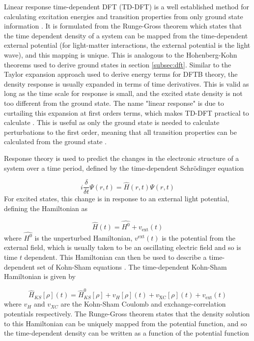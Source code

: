 Linear response time-dependent DFT (TD-DFT) is a well established method for calculating
excitation energies and transition properties from only ground state information \cite{Laurent2013}. 
It is formulated from the Runge-Gross theorem \cite{Runge1984} which states that the
time dependent density of a system can be mapped from the time-dependent external 
potential (for light-matter interactions, the external potential is the light wave), 
and this mapping is unique. This is analogous to the Hohenberg-Kohn theorems used
to derive ground states in section \ref{subsec:dft}. Similar to the Taylor expansion
approach used to derive energy terms for DFTB theory, the density response is usually
expanded in terms of time derivatives. This is valid as long as the time scale for 
response is small, and the excited state density is not too different from the ground
state. The name "linear response" is due to curtailing this expansion at first orders 
terms, which makes TD-DFT practical to calculate \cite{Marques2004}. This is useful
as only the ground state is needed to calculate perturbations to the first order, 
meaning that all transition properties can be calculated from the ground state \cite{Marques2004}.

Response theory is used to predict the changes in the electronic structure of a 
system over a time period, defined by the time-dependent Schr\"{o}dinger equation

\begin{equation}
    i \frac{\delta}{\delta t} \Psi\left(r, t\right) = \hat{H}\left(r, t\right) \Psi\left(r, t\right)
\end{equation}
%
For excited states, this change is in response to an external light potential, defining
the Hamiltonian as

\begin{equation}
\hat{H}\left(t\right) = \hat{H^0} + v_{\text{ext}}\left(t\right)
\end{equation}
%
where $\hat{H^0}$ is the unperturbed Hamiltonian, $v^{\text{ext}}\left(t\right)$ 
is the potential from the external field, which is usually taken to be an oscillating 
electric field and so is time $t$ dependent. This Hamiltonian can then be used to 
describe a time-dependent set of Kohn-Sham equations \cite{Kohn1964}. The time-dependent
Kohn-Sham Hamiltonian is given by

\begin{equation}
\hat{H}_{KS}\left[\rho\right]\left(t\right) = \hat{H}^0_{KS}\left[\rho\right] + v_H\left[\rho\right]\left(t\right) + v_{\text{XC}}\left[\rho\right]\left(t\right) + v_{\text{ext}}\left(t\right)
\end{equation} 
%
where $v_H$ and $v_{XC}$ are the Kohn-Sham Coulomb and exchange-correlation potentials 
respectively. The Runge-Gross theorem states that the density solution to this Hamiltonian
can be uniquely mapped from the potential function, and so the time-dependent density 
can be written as a function of the potential function


